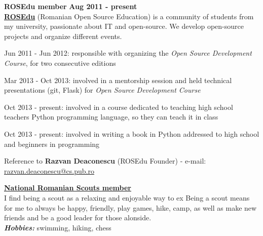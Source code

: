 \documentclass[margin,line]{resume}
\begin{document}
\begin{resume}
    \vspace{1.2mm}\textbf{ROSEdu member} \hfill \textbf{Aug 2011 - present} \vspace{1.5mm}\\
	\href{http://rosedu.org/}{\textbf{ROSEdu}} (Romanian Open Source Education) is a community of 
	students from my university, passionate about IT and open-source. We develop 
	open-source projects and organize different events.\vspace{1mm}
	\begin{list2}
        \item Jun 2011 - Jun 2012: responsible with organizing the \textit{Open Source Development Course}, for two consecutive editions
        \item Mar 2013 - Oct 2013: involved in a mentorship session and held technical presentations (git, Flask) for \textit{Open Source Development Course}
        \item Oct 2013 - present: involved in a course dedicated to teaching high school teachers Python programming language, so they can teach it in class
        \item Oct 2013 - present: involved in writing a book in Python addressed to high school and beginners in programming
	\end{list2}\vspace{-3mm}
	\small{Reference to \textbf{Razvan Deaconescu} (ROSEdu Founder)
		- e-mail: \href{mailto:razvan.deaconescu@cs.pub.ro}{razvan.deaconescu@cs.pub.ro}}

	\vspace{1.2mm}\href{http://www.scoutpanaitescu.ro/}{\textbf{National Romanian Scouts member}}\vspace{1mm}\\
	I find being a scout as a relaxing and enjoyable way to ex
	Being a scout means for me to always be happy, friendly, play games, hike, camp, as well as make new friends and be a good leader for those alonside.\vspace{1.5mm}\\
	\textbf{\textit{Hobbies:}} swimming, hiking, chess



\end{resume}
\end{document}
